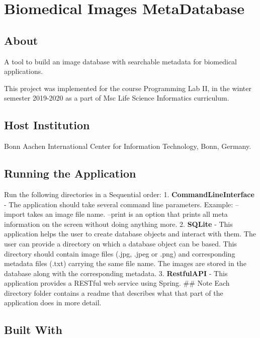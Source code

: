 \hypertarget{biomedical-images-metadatabase}{%
\section{Biomedical Images
MetaDatabase}\label{biomedical-images-metadatabase}}

\hypertarget{about}{%
\subsection{About}\label{about}}

A tool to build an image database with searchable metadata for
biomedical applications.

This project was implemented for the course Programming Lab II, in the
winter semester 2019-2020 as a part of Msc Life Science Informatics
curriculum.

\hypertarget{host-institution}{%
\subsection{Host Institution}\label{host-institution}}

Bonn Aachen International Center for Information Technology, Bonn,
Germany.

\hypertarget{running-the-application}{%
\subsection{Running the Application}\label{running-the-application}}

Run the following directories in a Sequential order: 1.
\textbf{CommandLineInterface} - The application should take several
command line parameters. Example: --import takes an image file name.
--print is an option that prints all meta information on the screen
without doing anything more. 2. \textbf{SQLite} - This application helps
the user to create database objects and interact with them. The user can
provide a directory on which a database object can be based. This
directory should contain image files (.jpg, .jpeg or .png) and
corresponding metadata files (.txt) carrying the same file name. The
images are stored in the database along with the corresponding metadata.
3. \textbf{RestfulAPI} - This application provides a RESTful web service
using Spring. \#\# Note Each directory folder contains a readme that
describes what that part of the application does in more detail.

\hypertarget{built-with}{%
\subsection{Built With}\label{built-with}}

